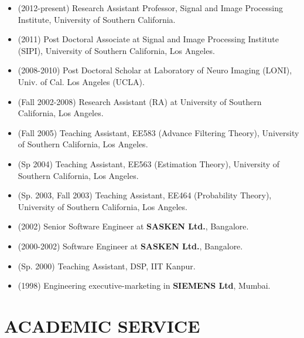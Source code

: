 \documentclass[overlapped,line,letterpaper]{res}
\begin{document}
\begin{resume}
\begin{itemize}
\item (2012-present) Research Assistant Professor, Signal and Image Processing Institute, University of Southern California. 
\item (2011) Post Doctoral Associate at Signal and Image Processing Institute (SIPI), University of Southern California, Los Angeles.
\item (2008-2010) Post Doctoral Scholar at Laboratory of Neuro Imaging (LONI), Univ. of Cal. Los Angeles (UCLA).
\item (Fall 2002-2008) Research Assistant (RA) at University of Southern California, Los Angeles.
\item (Fall 2005) Teaching Assistant, EE583 (Advance Filtering Theory), University of Southern California, Los Angeles.
\item (Sp 2004) Teaching Assistant, EE563 (Estimation Theory), University of Southern California, Los Angeles.
\item (Sp. 2003, Fall 2003) Teaching Assistant, EE464 (Probability Theory), University of Southern California, Los Angeles.
\item (2002) Senior Software Engineer at \textbf{SASKEN Ltd.}, Bangalore.
\item (2000-2002) Software Engineer at \textbf{SASKEN Ltd.}, Bangalore.
\item (Sp. 2000) Teaching Assistant, DSP, IIT Kanpur.
\item (1998) Engineering executive-marketing in \textbf{SIEMENS Ltd}, Mumbai.
\end{itemize}
\section{\bf ACADEMIC SERVICE}

\end{resume}
\end{document}
